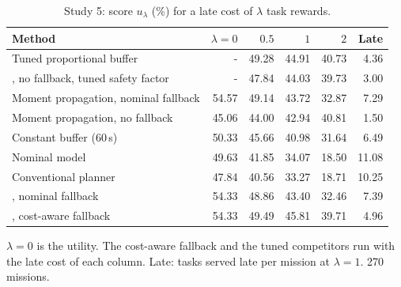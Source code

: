 \begin{table}[t]
\caption{Study 5: score $u_\lambda$ (\%) for a late cost of $\lambda$ task rewards.}\label{tab:s5}
\centering\small
\begin{threeparttable}
\begin{tabular}{lrrrrr}
\toprule
Method & $\lambda = 0$ & $0.5$ & $1$ & $2$ & Late \\
\midrule
Tuned proportional buffer & - & 49.28 & 44.91 & 40.73 & 4.36 \\
\mname{}, no fallback, tuned safety factor & - & 47.84 & 44.03 & 39.73 & 3.00 \\
Moment propagation, nominal fallback & 54.57 & 49.14 & 43.72 & 32.87 & 7.29 \\
Moment propagation, no fallback & 45.06 & 44.00 & 42.94 & 40.81 & 1.50 \\
Constant buffer (60\,s) & 50.33 & 45.66 & 40.98 & 31.64 & 6.49 \\
Nominal model & 49.63 & 41.85 & 34.07 & 18.50 & 11.08 \\
Conventional planner & 47.84 & 40.56 & 33.27 & 18.71 & 10.25 \\
\mname{}, nominal fallback & 54.33 & 48.86 & 43.40 & 32.46 & 7.39 \\
\mname{}, cost-aware fallback & 54.33 & 49.49 & 45.81 & 39.71 & 4.96 \\
\bottomrule
\end{tabular}
\begin{tablenotes}[flushleft]\scriptsize
\item[] $\lambda=0$ is the utility. The cost-aware fallback and the tuned competitors run with the late cost of each column. Late: tasks served late per mission at $\lambda=1$. 270 missions.
\end{tablenotes}
\end{threeparttable}
\end{table}
